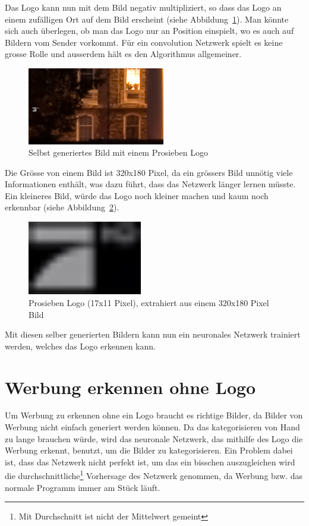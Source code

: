 \documentclass[12pt,a4paper]{report}
\begin{document}
Das Logo kann nun mit dem Bild negativ multipliziert, so dass das Logo an einem zufälligen Ort auf dem Bild erscheint (siehe Abbildung~\ref{fig:logo8}).
Man könnte sich auch überlegen, ob man das Logo nur an Position einspielt, wo es auch auf Bildern vom Sender vorkommt.
Für ein convolution Netzwerk spielt es keine grosse Rolle und ausserdem hält es den Algorithmus allgemeiner.
\begin{figure}[h]%
    \centering
    \includegraphics[width=6cm]{assets/images/logo_on_random_image.png}%
    \caption{Selbst generiertes Bild mit einem Prosieben Logo}%
    \label{fig:logo8}%
\end{figure}
Die Grösse von einem Bild ist 320x180 Pixel, da ein grössers Bild unnötig viele Informationen enthält,
was dazu führt, dass das Netzwerk länger lernen müsste.
Ein kleineres Bild, würde das Logo noch kleiner machen und kaum noch erkennbar (siehe Abbildung~\ref{fig:logo6}).
\begin{figure}[h]%
    \centering
    \includegraphics[width=5cm]{assets/images/logo17x11.png}%
    \caption{Prosieben Logo (17x11 Pixel), extrahiert aus einem 320x180 Pixel Bild}%
    \label{fig:logo6}%
\end{figure}

Mit diesen selber generierten Bildern kann nun ein neuronales Netzwerk trainiert werden, welches das Logo erkennen kann.
\section{Werbung erkennen ohne Logo}
Um Werbung zu erkennen ohne ein Logo braucht es richtige Bilder, da Bilder von Werbung nicht einfach generiert werden können.
Da das kategorisieren von Hand zu lange brauchen würde, wird das neuronale Netzwerk, das mithilfe des Logo die Werbung erkennt, benutzt,
um die Bilder zu kategorisieren.
Ein Problem dabei ist, dass das Netzwerk nicht perfekt ist,
um das ein bisschen auszugleichen wird die durchschnittliche\footnote{Mit Durchschnitt ist nicht der Mittelwert gemeint} Vorhersage des Netzwerk genommen,
da Werbung bzw. das normale Programm immer am Stück läuft.
\end{document}
